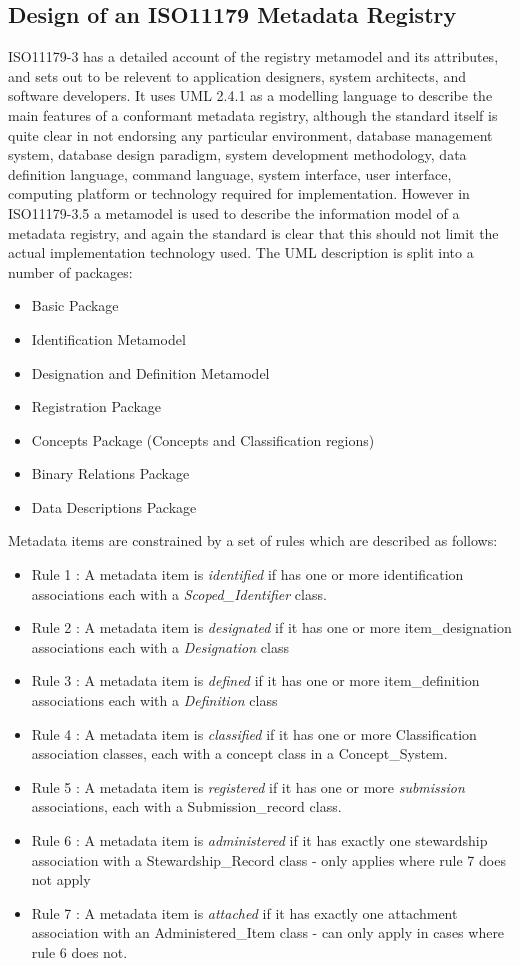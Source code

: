 \documentclass{llncs}
\begin{document}
\subsection{Design of an ISO11179 Metadata Registry}

ISO11179-3 has a detailed account of the registry metamodel and its attributes, and sets out to be relevent to application designers, system architects, and software developers. It uses UML 2.4.1 as a modelling language to describe the main features of a conformant metadata registry, although the standard itself is quite clear in not endorsing any particular environment, database management system, database design paradigm, system development methodology, data definition language, command language, system interface, user interface, computing platform or technology required for implementation. However in ISO11179-3.5 a metamodel is used to describe the information model of a metadata registry, and again the standard is clear that this should not limit the actual implementation technology used. The UML description is split into a number of packages:
\begin{itemize}
\item Basic Package
\item Identification Metamodel
\item Designation and Definition Metamodel
\item Registration Package
\item Concepts Package (Concepts and Classification regions)
\item Binary Relations Package
\item Data Descriptions Package
\end{itemize}
Metadata items are constrained by a set of rules which are described as follows:
\begin{itemize}
\item Rule 1 : A metadata item is  \emph{identified} if has one or more identification associations each with a \emph{Scoped\_Identifier} class.
\item Rule 2 : A metadata item is  \emph{designated} if it has one or more item\_designation associations each with a \emph{Designation} class
\item Rule 3 : A metadata item is \emph{defined} if it has one or more item\_definition associations each with a \emph{Definition} class
\item Rule 4 : A metadata item is \emph{classified} if it has one or more Classification association classes, each with a concept class in a Concept\_System.
\item Rule 5 : A metadata item is  \emph{registered} if it has one or more \emph{submission} associations, each with a Submission\_record class.
\item Rule 6 :  A metadata item is  \emph{administered} if it has exactly one stewardship association with a Stewardship\_Record class - only applies where rule 7 does not apply
\item Rule 7 : A metadata item is \emph{attached} if it has exactly one attachment association with an Administered\_Item class - can only apply in cases where rule 6 does not.
\end{itemize}
\end{document}
